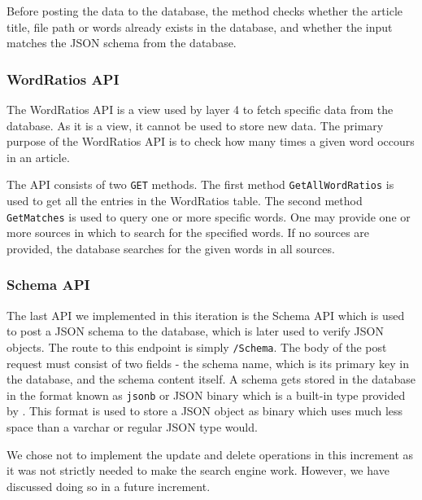 Before posting the data to the database, the method checks whether the article title, file path or words already exists in the database, and whether the input matches the JSON schema from the database.


\subsubsection{WordRatios API}
The WordRatios API is a view used by layer 4 to fetch specific data from the database.
As it is a view, it cannot be used to store new data. 
The primary purpose of the WordRatios API is to check how many times a given word occours in an article.

The API consists of two \texttt{GET} methods. 
The first method \texttt{GetAllWordRatios} is used to get all the entries in the WordRatios table.
The second method \texttt{GetMatches} is used to query one or more specific words. 
One may provide one or more sources in which to search for the specified words.
If no sources are provided, the database searches for the given words in all sources.

\subsubsection{Schema API}

The last API we implemented in this iteration is the Schema API which is used to post a JSON schema to the database, which is later used to verify JSON objects.
The route to this endpoint is simply \texttt{/Schema}. 
The body of the post request must consist of two fields - the schema name, which is its primary key in the database, and the schema content itself. 
A schema gets stored in the database in the format known as \texttt{jsonb} or JSON binary which is a built-in type provided by \postgres{}.
This format is used to store a JSON object as binary which uses much less space than a varchar or regular JSON type would.


We chose not to implement the update and delete operations in this increment as it was not strictly needed to make the search engine work.
However, we have discussed doing so in a future increment.